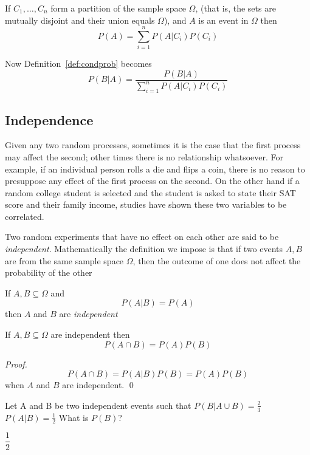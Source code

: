\documentclass[../main.tex]{subfiles}
\begin{document}
\begin{theorem}
	If $C_1, \ldots, C_n$ form a partition of the sample space $\Omega$, (that is,
	the sets are mutually disjoint and their union equals $\Omega$), and $A$ is
	an event in $\Omega$ then
	\begin{equation}
	P(A) = \sum_{i=1}^n P(A|C_i)P(C_i)
	\end{equation}
\end{theorem}
\noindent
Now  Definition~\ref{def:condprob} becomes
\begin{equation}
P(B | A) = \dfrac{P(B | A)}{\sum_{i=1}^n P(A|C_i)P(C_i)}
\end{equation}

\subsection{Independence}
Given any two random processes, sometimes it is the case that the first process may affect the second; other times there is no relationship whatsoever. For example, if an individual person
rolls a die and flips a coin, there is no reason to presuppose
any effect of the first process on the second. On the other
hand if a random college student is selected and the student
is asked to state their SAT score and their family income, studies
have shown these two variables to be correlated.

Two random experiments that have no effect on each other are said to be \textit{independent}. Mathematically the definition we impose is that if two events $A,B$ are from the same sample space $\Omega$, then the outcome of one does not affect the probability of the other
\begin{definition}
	If $A,B \subseteq \Omega$ and $$P(A|B) = P(A)$$ then $A$ and $B$ are \textit{independent}
\end{definition}
\begin{corollary}
	If $A,B \subseteq \Omega$ are independent then
		\begin{equation}
		P(A \cap B) = P(A)P(B)
		\end{equation}
\end{corollary}
\begin{proof}
	$$P(A \cap B) = P(A | B)P(B) = P(A)P(B)$$ when
		$A$ and $B$ are independent. \hfill\qed
\end{proof}

\begin{example}
	Let A and B be two independent events such that $P(B| A\cup B) = \frac23$
	$
	P(A | B) = \frac12$ What is $P(B)$?
\end{example}
\begin{solution}
	$\dfrac{1}{2}$
\end{solution}
\end{document}

